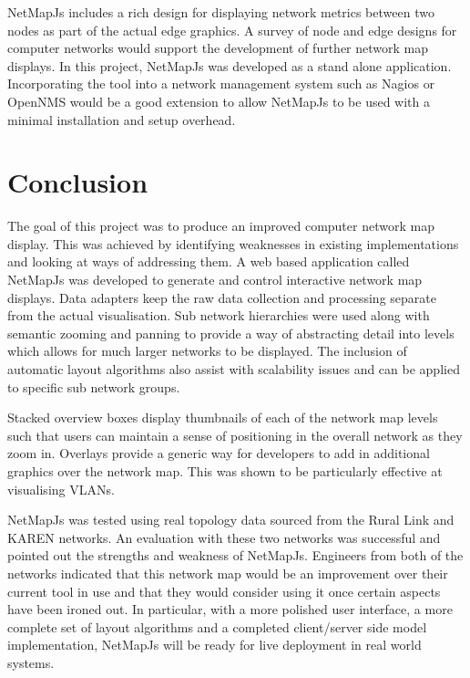 \documentclass[11pt, a4paper]{article}
\begin{document}
NetMapJs includes a rich design for displaying network metrics between two nodes
as part of the actual edge graphics. A survey of node and edge designs for
computer networks would support the development of further network map displays.
In this project, NetMapJs was developed as a stand alone application.
Incorporating the tool into a network management system such as
Nagios \cite{Nagios_website} or OpenNMS \cite{OpenNMS_website} would be a good
extension to allow NetMapJs to be used with a minimal installation and setup
overhead.

\newpage

\section{Conclusion}
\label{sec:conclusion}



The goal of this project was to produce an improved computer network map
display. This was achieved by identifying weaknesses in existing implementations
and looking at ways of addressing them. A web based application called NetMapJs
was developed to generate and control interactive network map displays. Data
adapters keep the raw data collection and processing separate from the actual
visualisation. Sub network hierarchies were used along with semantic zooming and
panning to provide a way of abstracting detail into levels which allows for much
larger networks to be displayed. The inclusion of automatic layout algorithms
also assist with scalability issues and can be applied to specific sub network
groups. 

Stacked overview boxes display thumbnails of each of the network map
levels such that users can maintain a sense of positioning in the overall
network as they zoom in. Overlays provide a generic way for developers to add in
additional graphics over the network map. This was shown to be particularly
effective at visualising VLANs.

NetMapJs was tested using real topology data sourced from the Rural Link and
KAREN networks. An evaluation with these two networks was successful and pointed
out the strengths and weakness of NetMapJs. Engineers from both of the networks
indicated that this network map would be an improvement over their current tool
in use and that they would consider using it once certain aspects have been
ironed out. In particular, with a more polished user interface, a more complete
set of layout algorithms and a completed client/server side model
implementation, NetMapJs will be ready for live deployment in real world
systems.
\end{document}
